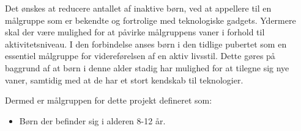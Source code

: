 Det ønskes at reducere antallet af inaktive børn, ved at appellere til en målgruppe som er bekendte og fortrolige med teknologiske gadgets. Ydermere skal der være mulighed for at påvirke målgruppens vaner i forhold til aktivitetsniveau. 
I den forbindelse anses børn i den tidlige pubertet som en essentiel målgruppe for videreførelsen af en aktiv livsstil. Dette gøres på baggrund af at børn i denne alder stadig har mulighed for at tilegne sig nye vaner, samtidig med at de har et stort kendskab til teknologier. 





Dermed er målgruppen for dette projekt defineret som: 

\begin{itemize}
\item Børn der befinder sig i alderen 8-12 år.
\end{itemize}
